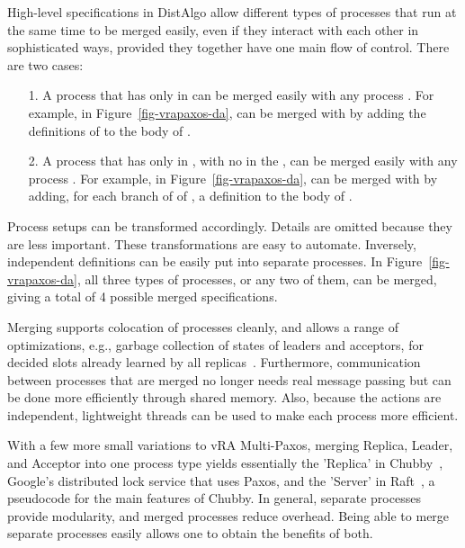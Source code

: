\documentclass[11pt]{article}
\newcommand\p[1]{\m{#1}}
\newcommand\m[1]{\mbox{$#1$}} %
\begin{document}
High-level specifications in DistAlgo allow different types of processes
that run at the same time to be merged easily, even if they interact with
each other in sophisticated ways, provided they together have one main flow
of control.  There are two cases:
\begin{enumerate}\lipics{}

\item[1.] A process \co{\p{P}} that has only  in  can be
  merged easily with any process \co{\p{Q}}.  For example, 
  in Figure~\ref{fig-vrapaxos-da},  can be merged
  with  by adding the  definitions of  to
  the body of .

\item[2.] A process \co{\p{P}} that has only  in
  , with no  in the , can be merged easily with
  any process \co{\p{Q}}.  For example, %
  in Figure~\ref{fig-vrapaxos-da},  can be merged with
   by adding, for each branch \co{\p{cond}:\,\p{stmt}} of
   of , a \co{receive \_:~if \p{cond}:\,\p{stmt}}
  definition to the body of .

\end{enumerate}\lipics{}
Process setups can be transformed accordingly.  Details are omitted because
they are less important.
These transformations are easy to automate.  Inversely, independent
 definitions can be easily put into separate processes.
In Figure~\ref{fig-vrapaxos-da}, all three types of
processes, or any two of them, can be merged, giving a total of 4 possible
merged specifications.

Merging supports colocation of processes cleanly, and allows a range of
optimizations, e.g., %
garbage collection of states of leaders and acceptors, for decided slots
already learned by all replicas~\cite{vra15paxos}.
Furthermore, communication between processes that are merged no longer
needs real message passing but can be done more efficiently through shared
memory.  Also, because the actions are independent, lightweight threads can
be used to make each process more efficient.


With a few more small variations to vRA Multi-Paxos, merging Replica,
Leader, and Acceptor into one process type yields essentially the 'Replica'
in Chubby~\cite{burrows06chubby}, Google's distributed lock service that
uses Paxos, and the 'Server' in Raft~\cite{ongaro14raft}, a pseudocode for
the main features of Chubby.  In general, separate processes provide
modularity, and merged processes reduce overhead.  Being able to merge
separate processes easily allows one to obtain the benefits of both.
\end{document}
